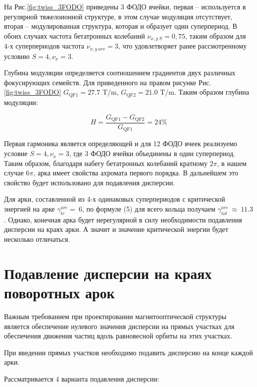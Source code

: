 На Рис.\ref{fig:twiss_3FODO} приведены 3 ФОДО ячейки, первая – используется в регулярной тяжелоионной структуре, в этом случае модуляция отсутствует, вторая – модулированная структура,  которая и образует один суперпериод. В обоих случаях частота бетатронных колебаний $\nu_{x,y\ S}=0,75$, таким образом для 4-х суперпериодов частота $\nu_{x,y\ arc}=3$, что удовлетворяет ранее рассмотренному условию $S=4, \nu_x=3$.

Глубина модуляции определяется соотношением градиентов двух различных фокусирующих семейств. Для приведенного на правом рисунке Рис.\ref{fig:twiss_3FODO} $G_{\textrm{QF1}}=27.7$ T/m, $G_{\textrm{QF2}}=21.0$ T/m. Таким образом глубина модуляции:

\begin{equation}
H=\frac{G_{\textrm{QF1}}-G_{\textrm{QF2}}}{G_{\textrm{QF1}}}=24\%
\label {eq:gamma_tr_modulated}
\end{equation}

\par Первая гармоника является определяющей и для 12 ФОДО ячеек реализуемо условие $S=4, \nu_x=3$, где 3 ФОДО ячейки объединены в один суперпериод. Таким образом, благодаря набегу бетатронных колебаний кратному $2\pi$, в нашем случае $6\pi$, арка имеет свойства ахромата первого порядка. В дальнейшем это свойство будет использовано для подавления дисперсии.

\par Для арки, составленной из 4-х одинаковых суперпериодов с критической энергией  на арке $\gamma_{tr}^{arc}=\ 6$, по формуле (5) для всего кольца получаем $\gamma_{tot}^{arc}\ \approx\ 11.3$. Однако, конечная арка будет нерегулярной в силу необходимости подавления дисперсии на краях арки. А значит и значение критической энергии будет несколько отличаться.

\section{Подавление дисперсии на краях поворотных арок}\label{sec:transition_variation/disp_supperssion}

\par Важным требованием при проектировании магнитооптической структуры является обеспечение нулевого значения дисперсии на прямых участках для обеспечения движения частиц вдоль равновесной орбиты на этих участках.

При введении прямых участков необходимо подавить дисперсию на конце каждой арки.

Рассматривается 4 варианта подавления дисперсии:

